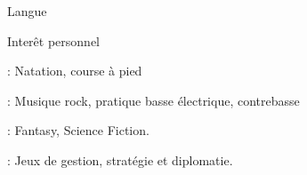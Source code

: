 \documentclass[a4paper, 11pt]{article}
\begin{document}
\begin{Section}{Langue}
 
\end{Section} 
%
%
%
%
%
%
\begin{Section}{Interêt personnel}

 : Natation, course à pied

 : Musique rock, pratique basse électrique, contrebasse

 : Fantasy, Science Fiction.

 : Jeux de gestion, stratégie et diplomatie.

\end{Section}


\end{document}
